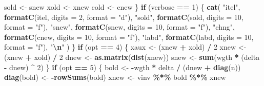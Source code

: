 \documentclass[
  12pt,
]{article}
\newenvironment{Shaded}{\begin{snugshade}}{\end{snugshade}}
\newcommand{\AttributeTok}[1]{\textcolor[rgb]{0.13,0.29,0.53}{#1}}
\newcommand{\ControlFlowTok}[1]{\textcolor[rgb]{0.13,0.29,0.53}{\textbf{#1}}}
\newcommand{\DecValTok}[1]{\textcolor[rgb]{0.00,0.00,0.81}{#1}}
\newcommand{\FunctionTok}[1]{\textcolor[rgb]{0.13,0.29,0.53}{\textbf{#1}}}
\newcommand{\NormalTok}[1]{#1}
\newcommand{\OtherTok}[1]{\textcolor[rgb]{0.56,0.35,0.01}{#1}}
\newcommand{\SpecialCharTok}[1]{\textcolor[rgb]{0.81,0.36,0.00}{\textbf{#1}}}
\newcommand{\StringTok}[1]{\textcolor[rgb]{0.31,0.60,0.02}{#1}}
\begin{document}
\begin{Shaded}
\begin{Highlighting}[]
\NormalTok{    sold }\OtherTok{\textless{}{-}}\NormalTok{ snew}
\NormalTok{    xold }\OtherTok{\textless{}{-}}\NormalTok{ xnew}
\NormalTok{    cold }\OtherTok{\textless{}{-}}\NormalTok{ cnew}
\NormalTok{  \}}
  \ControlFlowTok{if}\NormalTok{ (verbose }\SpecialCharTok{==} \DecValTok{1}\NormalTok{) \{}
    \FunctionTok{cat}\NormalTok{(}
      \StringTok{"itel"}\NormalTok{,}
      \FunctionTok{formatC}\NormalTok{(itel, }\AttributeTok{digits =} \DecValTok{2}\NormalTok{, }\AttributeTok{format =} \StringTok{"d"}\NormalTok{),}
      \StringTok{"sold"}\NormalTok{,}
      \FunctionTok{formatC}\NormalTok{(sold, }\AttributeTok{digits =} \DecValTok{10}\NormalTok{, }\AttributeTok{format =} \StringTok{"f"}\NormalTok{),}
      \StringTok{"snew"}\NormalTok{,}
      \FunctionTok{formatC}\NormalTok{(snew, }\AttributeTok{digits =} \DecValTok{10}\NormalTok{, }\AttributeTok{format =} \StringTok{"f"}\NormalTok{),}
      \StringTok{"chng"}\NormalTok{,}
      \FunctionTok{formatC}\NormalTok{(cnew, }\AttributeTok{digits =}  \DecValTok{10}\NormalTok{, }\AttributeTok{format =} \StringTok{"f"}\NormalTok{),}
      \StringTok{"labd"}\NormalTok{,}
      \FunctionTok{formatC}\NormalTok{(labd, }\AttributeTok{digits =}  \DecValTok{10}\NormalTok{, }\AttributeTok{format =} \StringTok{"f"}\NormalTok{),}
      \StringTok{"}\SpecialCharTok{\textbackslash{}n}\StringTok{"}
\NormalTok{    )}
\NormalTok{  \}}
  \ControlFlowTok{if}\NormalTok{ (opt }\SpecialCharTok{==} \DecValTok{4}\NormalTok{) \{}
\NormalTok{    xaux }\OtherTok{\textless{}{-}}\NormalTok{ (xnew }\SpecialCharTok{+}\NormalTok{ xold) }\SpecialCharTok{/} \DecValTok{2}
\NormalTok{    xnew }\OtherTok{\textless{}{-}}\NormalTok{ (xnew }\SpecialCharTok{+}\NormalTok{ xold) }\SpecialCharTok{/} \DecValTok{2}
\NormalTok{    dnew }\OtherTok{\textless{}{-}} \FunctionTok{as.matrix}\NormalTok{(}\FunctionTok{dist}\NormalTok{(xnew))}
\NormalTok{    snew }\OtherTok{\textless{}{-}} \FunctionTok{sum}\NormalTok{(wgth }\SpecialCharTok{*}\NormalTok{ (delta }\SpecialCharTok{{-}}\NormalTok{ dnew) }\SpecialCharTok{\^{}} \DecValTok{2}\NormalTok{)}
\NormalTok{  \}}
  \ControlFlowTok{if}\NormalTok{ (opt }\SpecialCharTok{==} \DecValTok{5}\NormalTok{) \{}
\NormalTok{    bold }\OtherTok{\textless{}{-}} \SpecialCharTok{{-}}\NormalTok{wgth }\SpecialCharTok{*}\NormalTok{ delta }\SpecialCharTok{/}\NormalTok{ (dnew }\SpecialCharTok{+} \FunctionTok{diag}\NormalTok{(n))}
    \FunctionTok{diag}\NormalTok{(bold) }\OtherTok{\textless{}{-}} \SpecialCharTok{{-}}\FunctionTok{rowSums}\NormalTok{(bold)}
\NormalTok{    xnew }\OtherTok{\textless{}{-}}\NormalTok{ vinv }\SpecialCharTok{\%*\%}\NormalTok{ bold }\SpecialCharTok{\%*\%}\NormalTok{ xnew}

\end{Highlighting}
\end{Shaded}
\end{document}
